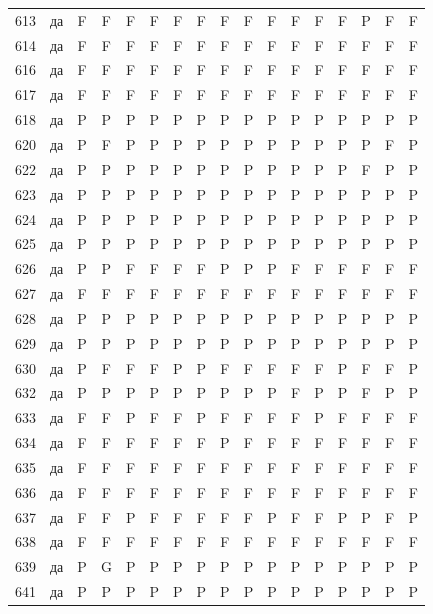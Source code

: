 \begin{table}[p]
\begin{tabular*}{\textwidth}{@{\extracolsep{\fill}}rcccccccccccccccc}
613 & да & F & F & F & F & F & F & F & F & F & F & F & F & P & F & F\\
614 & да & F & F & F & F & F & F & F & F & F & F & F & F & F & F & F\\
616 & да & F & F & F & F & F & F & F & F & F & F & F & F & F & F & F\\
617 & да & F & F & F & F & F & F & F & F & F & F & F & F & F & F & F\\
618 & да & P & P & P & P & P & P & P & P & P & P & P & P & P & P & P\\
620 & да & P & F & P & P & P & P & P & P & P & P & P & P & P & F & P\\
622 & да & P & P & P & P & P & P & P & P & P & P & P & P & F & P & P\\
623 & да & P & P & P & P & P & P & P & P & P & P & P & P & P & P & P\\
624 & да & P & P & P & P & P & P & P & P & P & P & P & P & P & P & P\\
625 & да & P & P & P & P & P & P & P & P & P & P & P & P & P & P & P\\
626 & да & P & P & F & F & F & F & P & P & P & F & F & F & F & F & F\\
627 & да & F & F & F & F & F & F & F & F & F & F & F & F & F & F & F\\
628 & да & P & P & P & P & P & P & P & P & P & P & P & P & P & P & P\\
629 & да & P & P & P & P & P & P & P & P & P & P & P & P & P & P & P\\
630 & да & P & F & F & F & P & P & F & F & F & F & F & P & F & F & P\\
632 & да & P & P & P & P & P & P & P & P & P & F & P & P & F & P & P\\
633 & да & F & F & P & F & F & P & F & F & F & F & P & F & F & F & F\\
634 & да & F & F & F & F & F & F & P & F & F & F & F & F & F & F & F\\
635 & да & F & F & F & F & F & F & F & F & F & F & F & F & F & F & F\\
636 & да & F & F & F & F & F & F & F & F & F & F & F & F & F & F & F\\
637 & да & F & F & P & F & F & F & F & F & P & F & F & P & P & F & P\\
638 & да & F & F & F & F & F & F & F & F & F & F & F & F & F & F & F\\
639 & да & P & G & P & P & P & P & P & P & P & P & P & P & P & P & P\\
641 & да & P & P & P & P & P & P & P & P & P & P & P & P & P & P & P\\
\bottomrule\end{tabular*}\end{table}
\clearpage

